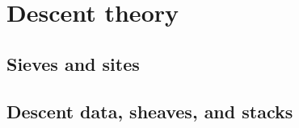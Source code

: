 \section{Descent theory}
    \subsection{Sieves and sites}
    
    \subsection{Descent data, sheaves, and stacks}
